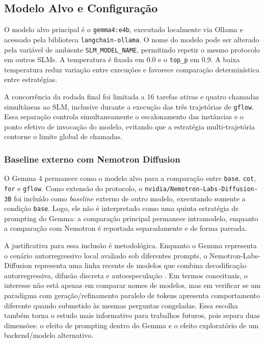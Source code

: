 \documentclass[12pt]{article}
\begin{document}
\subsection{Modelo Alvo e Configuração}

O modelo alvo principal é o \texttt{gemma4:e4b}, executado localmente via Ollama e acessado pela biblioteca \texttt{langchain-ollama}. O nome do modelo pode ser alterado pela variável de ambiente \texttt{SLM\_MODEL\_NAME}, permitindo repetir o mesmo protocolo em outros SLMs. A temperatura é fixada em 0.0 e o \texttt{top\_p} em 0.9. A baixa temperatura reduz variação entre execuções e favorece comparação determinística entre estratégias.

A concorrência da rodada final foi limitada a 16 tarefas ativas e quatro chamadas simultâneas ao SLM, inclusive durante a execução das três trajetórias de \texttt{gflow}. Essa separação controla simultaneamente o escalonamento das instâncias e o ponto efetivo de invocação do modelo, evitando que a estratégia multi-trajetória contorne o limite global de chamadas.

\subsubsection{Baseline externo com Nemotron Diffusion}

O Gemma 4 permanece como o modelo alvo para a compara\c{c}\~ao entre \texttt{base}, \texttt{cot}, \texttt{for} e \texttt{gflow}. Como extens\~ao do protocolo, o \texttt{nvidia/Nemotron-Labs-Diffusion-3B} foi inclu\'ido como \emph{baseline} externo de outro modelo, executando somente a condi\c{c}\~ao \texttt{base}. Logo, ele n\~ao \'{e} interpretado como uma quinta estrat\'egia de prompting do Gemma: a compara\c{c}\~ao principal permanece intramodelo, enquanto a compara\c{c}\~ao com Nemotron \'{e} reportada separadamente e de forma pareada.

A justificativa para essa inclus\~ao \'{e} metodol\'ogica. Enquanto o Gemma representa o cen\'ario autorregressivo local avaliado sob diferentes prompts, o Nemotron-Labs-Diffusion representa uma linha recente de modelos que combina decodifica\c{c}\~ao autorregressiva, difus\~ao discreta e autoespecula\c{c}\~ao \cite{nemotronlabsdiffusion2026}. Em termos conceituais, o interesse n\~ao est\'a apenas em comparar nomes de modelos, mas em verificar se um paradigma com gera\c{c}\~ao/refinamento paralelo de tokens apresenta comportamento diferente quando submetido \`as mesmas perguntas congeladas. Essa escolha tamb\'em torna o estudo mais informativo para trabalhos futuros, pois separa duas dimens\~oes: o efeito de prompting dentro do Gemma e o efeito explorat\'orio de um backend/modelo alternativo.
\end{document}
